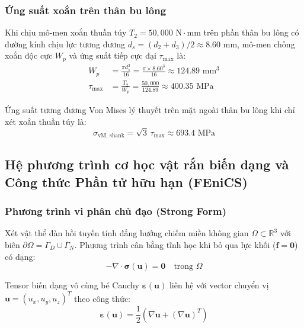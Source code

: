 \documentclass[12pt,a4paper]{article}
\begin{document}
\subsubsection{Ứng suất xoắn trên thân bu lông}
Khi chịu mô-men xoắn thuần túy $T_2 = 50,000\text{ N}\cdot\text{mm}$ trên phần thân bu lông có đường kính chịu lực tương đương $d_s = (d_2 + d_3)/2 \approx 8.60\text{ mm}$, mô-men chống xoắn độc cực $W_p$ và ứng suất tiếp cực đại $\tau_{\max}$ là:
\begin{align}
    W_p &= \frac{\pi d_s^3}{16} = \frac{\pi \times 8.60^3}{16} \approx 124.89\text{ mm}^3 \\
    \tau_{\max} &= \frac{T_2}{W_p} = \frac{50,000}{124.89} \approx 400.35\text{ MPa}
\end{align}

Ứng suất tương đương Von Mises lý thuyết trên mặt ngoài thân bu lông khi chỉ xét xoắn thuần túy là:
\begin{equation}
    \sigma_{\text{vM, shank}} = \sqrt{3}\,\tau_{\max} \approx 693.4\text{ MPa}
\end{equation}

\subsection{Hệ phương trình cơ học vật rắn biến dạng và Công thức Phần tử hữu hạn (FEniCS)}

\subsubsection{Phương trình vi phân chủ đạo (Strong Form)}
Xét vật thể đàn hồi tuyến tính đẳng hướng chiếm miền không gian $\Omega \subset \mathbb{R}^3$ với biên $\partial \Omega = \Gamma_D \cup \Gamma_N$. Phương trình cân bằng tĩnh học khi bỏ qua lực khối ($\mathbf{f} = \mathbf{0}$) có dạng:
\begin{equation}
    -\nabla \cdot \boldsymbol{\sigma}(\mathbf{u}) = \mathbf{0} \quad \text{trong } \Omega
\end{equation}

Tensor biến dạng vô cùng bé Cauchy $\boldsymbol{\varepsilon}(\mathbf{u})$ liên hệ với vector chuyển vị $\mathbf{u} = (u_x, u_y, u_z)^T$ theo công thức:
\begin{equation}
    \boldsymbol{\varepsilon}(\mathbf{u}) = \frac{1}{2} \left( \nabla \mathbf{u} + (\nabla \mathbf{u})^T \right)
\end{equation}
\end{document}
